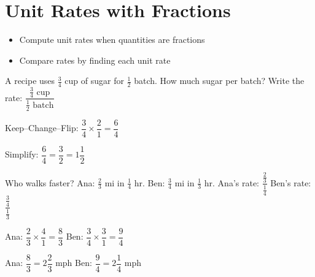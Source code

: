 \section{Unit Rates with Fractions}

\begin{stepGoal}
\begin{itemize}
    \item Compute unit rates when quantities are fractions
    \item Compare rates by finding each unit rate
\end{itemize}
\end{stepGoal}

\begin{stepVocabBox}
\end{stepVocabBox}

\begin{stepsCard}
\end{stepsCard}

\begin{stepExample}{A recipe uses $\frac{3}{4}$ cup of sugar for $\frac{1}{2}$ batch. How much sugar per batch?}
     Write the rate: $\dfrac{\frac{3}{4} \text{ cup}}{\frac{1}{2} \text{ batch}}$

     Keep--Change--Flip: $\dfrac{3}{4} \times \dfrac{2}{1} = \dfrac{6}{4}$

     Simplify: $\dfrac{6}{4} = \dfrac{3}{2} = 1\dfrac{1}{2}$
\end{stepExample}

\begin{stepExample}{Who walks faster? Ana: $\frac{2}{3}$ mi in $\frac{1}{4}$ hr. Ben: $\frac{3}{4}$ mi in $\frac{1}{3}$ hr.}
     Ana's rate: $\dfrac{\frac{2}{3}}{\frac{1}{4}}$ \qquad Ben's rate: $\dfrac{\frac{3}{4}}{\frac{1}{3}}$

     Ana: $\dfrac{2}{3} \times \dfrac{4}{1} = \dfrac{8}{3}$ \qquad Ben: $\dfrac{3}{4} \times \dfrac{3}{1} = \dfrac{9}{4}$

     Ana: $\dfrac{8}{3} = 2\dfrac{2}{3}$ mph \qquad Ben: $\dfrac{9}{4} = 2\dfrac{1}{4}$ mph
\end{stepExample}

